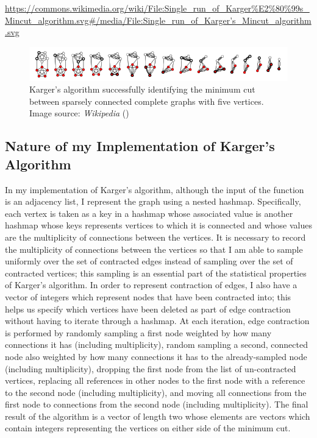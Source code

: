 \documentclass[10pt]{article}
\begin{document}
{\urldef\wikiurl\url{https://commons.wikimedia.org/wiki/File:Single_run_of_Karger%E2%80%99s_Mincut_algorithm.svg#/media/File:Single_run_of_Karger’s_Mincut_algorithm.svg}

\begin{figure}[h!]
	\centering
	\includegraphics[width=0.8\linewidth]{wiki_karger.png}
	\caption{Karger's algorithm successfully identifying the minimum cut between sparsely connected complete graphs with five vertices.
	Image source: {\em Wikipedia} (\wikiurl)}
\end{figure}

\subsection{Nature of my Implementation of Karger's Algorithm}

In my implementation of Karger's algorithm, although the input of the function is an adjacency list, I represent the graph using a nested hashmap.
Specifically, each vertex is taken as a key in a hashmap whose associated value is another hashmap whose keys represents vertices to which it is connected and whose values are the multiplicity of connections between the vertices.
It is necessary to record the multiplicity of connections between the vertices so that I am able to sample uniformly over the set of contracted edges instead of sampling over the set of contracted vertices; this sampling is an essential part of the statistical properties of Karger's algorithm.
In order to represent contraction of edges, I also have a vector of integers which represent nodes that have been contracted into; this helps us specify which vertices have been deleted as part of edge contraction without having to iterate through a hashmap.
At each iteration, edge contraction is performed by randomly sampling a first node weighted by how many connections it has (including multiplicity), random sampling a second, connected node also weighted by how many connections it has to the already-sampled node (including multiplicity), dropping the first node from the list of un-contracted vertices, replacing all references in other nodes to the first node with a reference to the second node (including multiplicity), and moving all connections from the first node to connections from the second node (including multiplicity).
The final result of the algorithm is a vector of length two whose elements are vectors which contain integers representing the vertices on either side of the minimum cut.


}
\end{document}
